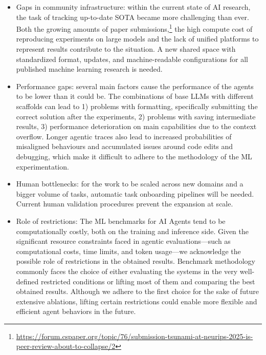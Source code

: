 \documentclass{fairmeta}
\begin{document}
\begin{itemize}
    \item Gaps in community infrastructure: within the current state of AI research, the task of tracking up-to-date SOTA became more challenging than ever. Both the growing amounts of paper submissions,\footnote{\url{https://forum.cspaper.org/topic/76/submission-tsunami-at-neurips-2025-is-peer-review-about-to-collapse/2}} the high compute cost of reproducing experiments on large models and the lack of unified platforms to represent results    contribute to the situation. A new shared space with standardized format, updates, and machine-readable configurations for all published machine learning research is needed.
    \item Performance gaps: several main factors cause the performance of the agents to be lower than it could be. The combinations of base LLMs with different scaffolds can lead to 1) problems with formatting, specifically submitting the correct solution after the experiments, 2) problems with saving intermediate results, 3) performance deterioration on main capabilities due to the context overflow. Longer agentic traces also lead to increased probabilities of misaligned behaviours and accumulated issues around code edits and debugging, which make it difficult to adhere to the methodology of the ML experimentation.
    \item Human bottlenecks: for the work to be scaled across new domains and a bigger volume of tasks, automatic task onboarding pipelines will be needed. Current human validation procedures prevent the expansion at scale.
    \item Role of restrictions: The ML benchmarks for AI Agents tend to be computationally costly, both on the training and inference side. Given the significant resource constraints faced in agentic evaluations---such as computational costs, time limits, and token usage---we acknowledge the possible role of restrictions in the obtained results. Benchmark methodology commonly faces the choice of either evaluating the systems in the very well-defined restricted conditions or lifting most of them and comparing the best obtained results. Although we adhere to the first choice for the sake of future extensive ablations, lifting certain restrictions could enable more flexible and efficient agent behaviors in the future.

\end{itemize}
\end{document}
